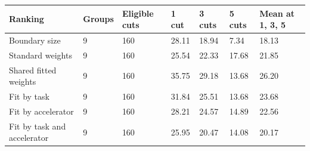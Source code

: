 \begin{tabular}{@{}lllllll@{}}
\toprule
Ranking & Groups & Eligible cuts & 1 cut & 3 cuts & 5 cuts & Mean at 1, 3, 5 \\
\midrule
Boundary size & 9 & 160 & 28.11 & 18.94 & 7.34 & 18.13 \\
Standard weights & 9 & 160 & 25.54 & 22.33 & 17.68 & 21.85 \\
Shared fitted weights & 9 & 160 & 35.75 & 29.18 & 13.68 & 26.20 \\
Fit by task & 9 & 160 & 31.84 & 25.51 & 13.68 & 23.68 \\
Fit by accelerator & 9 & 160 & 28.21 & 24.57 & 14.89 & 22.56 \\
Fit by task and accelerator & 9 & 160 & 25.95 & 20.47 & 14.08 & 20.17 \\
\bottomrule
\end{tabular}
